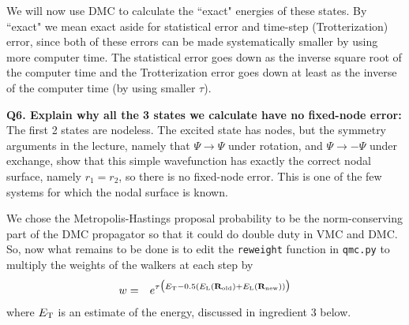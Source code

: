 \documentclass[11pt,aps,prb,amsmath,amssymb,superscriptaddress,notitlepage]{revtex4-1}
\def\beq{\begin{eqnarray}}
\def\eeq{\end{eqnarray}}
\def\Rvec{{\bf R}}
\def\EL{E_{\rm L}}
\begin{document}
We will now use DMC to calculate the ``exact" energies of these states.  By ``exact" we mean exact aside
for statistical error and time-step (Trotterization) error, since both of these errors can be made systematically
smaller by using more computer time.  The statistical error goes down as the inverse square root of the computer time
and the Trotterization error goes down at least as the inverse of the computer time (by using smaller $\tau$).

{\color{blue}
\textbf{Q6. Explain why all the 3 states we calculate have no fixed-node error:}}\\
{\color{darkgreen} The first 2 states are nodeless.  The excited state has nodes, but the symmetry arguments
in the lecture, namely that $\Psi \to \Psi$ under rotation, and $\Psi \to -\Psi$ under exchange, show that this
simple wavefunction has exactly the correct nodal surface, namely $r_1 = r_2$, so there is no fixed-node error.
This is one of the few systems for which the nodal surface is known.}

We chose the Metropolis-Hastings proposal probability to be the norm-conserving part of the DMC propagator
so that it could do double duty in VMC and DMC.  So, now what remains to be done is to edit the
\Verb"reweight" function in \Verb"qmc.py" to multiply the
weights of the walkers at each step by
\beq
w &=& e^{\tau\big(\ET-0.5(\EL(\Rvec_{\rm old}) + \EL(\Rvec_{\rm new}))\big)}
\label{rewt}
\eeq
where $E_{\rm T}$ is an estimate of the energy, discussed in ingredient 3 below.
\end{document}
